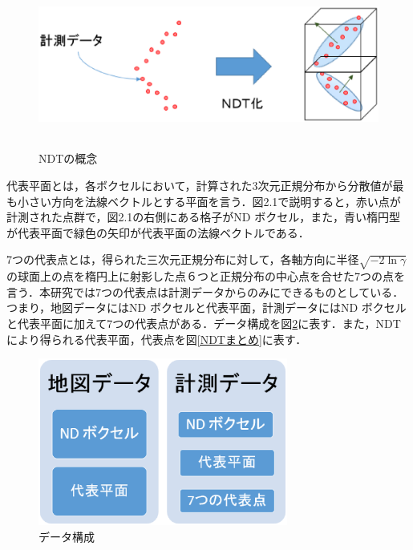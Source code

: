 %
\begin{figure}[htbp]
  \vspace{-3mm}
  \begin{center}
   \includegraphics[height=55mm]{figure/NDTの概念.eps}
   \vspace{-5mm}
   \caption{NDTの概念}
   \label{NDTの概念}
  \end{center}
\end{figure}
%
\newpage
%
代表平面とは，各ボクセルにおいて，計算された3次元正規分布から分散値が最も小さい方向を法線ベクトルとする平面を言う．図2.1で説明すると，赤い点が計測された点群で，図2.1の右側にある格子がND ボクセル，また，青い楕円型が代表平面で緑色の矢印が代表平面の法線ベクトルである．\par
7つの代表点とは，得られた三次元正規分布に対して，各軸方向に半径$\sqrt{-2\ln \gamma}$の球面上の点を楕円上に射影した点６つと正規分布の中心点を合せた7つの点を言う．本研究では7つの代表点は計測データからのみにできるものとしている．つまり，地図データにはND ボクセルと代表平面，計測データにはND ボクセルと代表平面に加えて7つの代表点がある．データ構成を図{\ref{データ構成}}に表す．また，NDTにより得られる代表平面，代表点を図{\ref{NDTまとめ}}に表す．
%
\begin{figure}[htbp]
  \vspace{-3mm}
  \begin{center}
   \includegraphics[height=55mm]{figure/データ構成.eps}
   \vspace{-5mm}
   \caption{データ構成}
   \label{データ構成}
  \end{center}
\end{figure}
%


